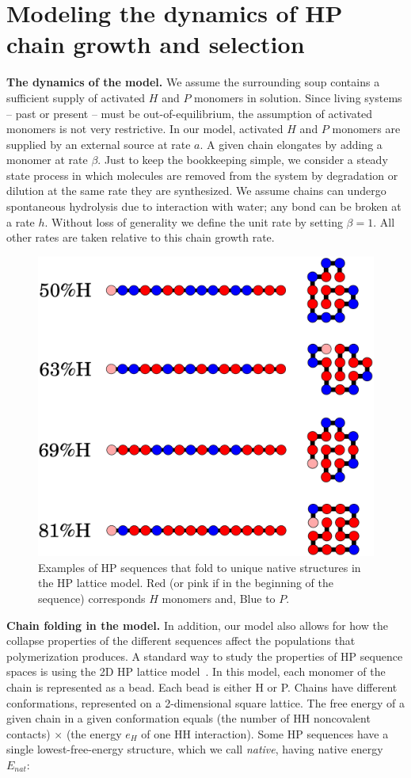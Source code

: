 \documentclass[5p,times]{elsarticle}
\begin{document}
\section{Modeling the dynamics of HP chain growth and selection}
 
 \textbf{The dynamics of the model.}  We assume the surrounding soup contains a sufficient supply of 
activated $H$ and $P$ 
monomers in solution.  Since living systems -- past or present -- must be out-of-equilibrium, the 
assumption of activated monomers is not very restrictive.  In our model, activated $H$ and $P$ 
monomers are supplied by an external source at rate $a$.  A given chain elongates by adding a 
monomer at rate $\beta$.  Just to keep the bookkeeping simple, we consider a steady state process 
in which molecules are removed from the system by degradation or dilution at the same rate they are 
synthesized.  We assume chains can undergo spontaneous hydrolysis due to interaction with water; 
any bond can be broken at a rate $h$. Without loss of generality we define the unit rate by setting 
$\beta = 1$.  All other rates are taken relative to this chain growth rate.
 
 \begin{figure}[h!]
  \centering
  \includegraphics[width=0.8\columnwidth]{pictures/tst-seqs.pdf} 
  \caption{\footnotesize{Examples of HP sequences that fold to unique native structures in the 
HP lattice model. Red (or pink if in the beginning of the sequence) corresponds $H$ monomers and, 
Blue to $P$.}}
  \label{fig:hydro-effect}
\end{figure}
 \textbf{Chain folding in the model.}  In addition, our model also allows for how the collapse 
properties of the different sequences affect the populations that polymerization produces.  A 
standard way to study the properties of HP sequence spaces is using the 2D HP lattice 
model~\cite{lau1989lattice,Chan1991}.  In this model, each monomer of the chain is represented as a 
bead.  Each bead is either H or P.  Chains have different conformations, represented on a 
2-dimensional square lattice.  The free energy of a given chain in a given conformation equals (the 
number of HH noncovalent contacts) $\times$ (the energy $e_H$ of one HH interaction).  Some HP 
sequences have a single lowest-free-energy structure, which we call \emph{native}, having native 
energy $E_{nat}$:
\end{document}
